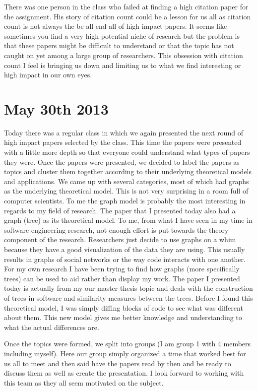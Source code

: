 \documentclass[conference]{IEEEtran}
\begin{document}
There was one person in the class who failed at finding a high citation paper
for the assignment. His story of citation count could be a lesson for us all
as citation count is not always the be all end all of high impact papers. It
seems like sometimes you find a very high potential niche of research but the 
problem is that these papers might be difficult to understand or that the topic
has not caught on yet among a large group of researchers. This obsession with
citation count I feel is bringing us down and limiting us to what we find 
interesting or high impact in our own eyes.

\section{May 30th 2013}
Today there was a regular class in which we again presented the next round of
high impact papers selected by the class. This time the papers were presented
with a little more depth so that everyone could understand what types of papers
they were. Once the papers were presented, we decided to label the papers as
topics and cluster them together according to their underlying theoretical models
and applications. We came up with several categories, most of which had graphs
as the underlying theoretical model. This is not very surprising in a room full
of computer scientists. To me the graph model is probably the most interesting
in regards to my field of research. The paper that I presented today also had
a graph (tree) as its theoretical model. To me, from what I have seen in my time in
software engineering research, not enough effort is put towards the theory component
of the research. Researchers just decide to use graphs on a whim because they have
a good visualization of the data they are using. This usually results in graphs
of social networks or the way code interacts with one another. For my own research
I have been trying to find how graphs (more specifically trees) can be used to aid
rather than display my work. The paper I presented today is actually from my
our master thesis topic and deals with the construction of trees in software and
similarity measures between the trees. Before I found this theoretical model, I was
simply diffing blocks of code to see what was different about them. This new model
gives me better knowledge and understanding to what the actual differences are.

Once the topics were formed, we split into groups (I am group 1 with 4 members 
including myself). Here our group simply organized a time that worked best for us
all to meet and then said have the papers read by then and be ready to discuss them
as well as create the presentation. I look forward to working with this team as 
they all seem motivated on the subject.
\end{document}
